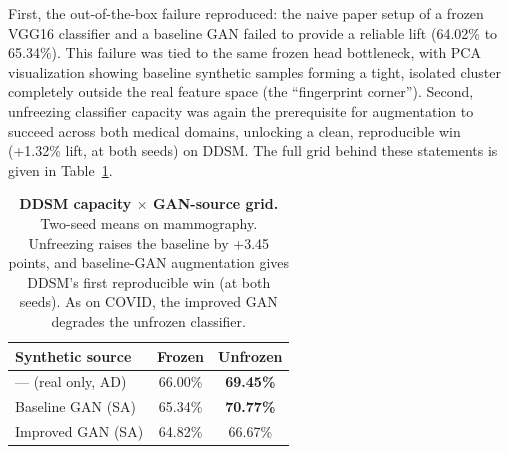\documentclass[11pt]{article}
\begin{document}
\begin{table}[htbp]
\centering
\caption{\textbf{Replication on CBIS-DDSM: Matched-Epoch GAN Comparison.} Classification results on mammography mass-only ROIs showing baseline and improved architectures trained to exactly 300 epochs.}
\label{tab:ddsm_matched_epoch}
\end{table}

First, the out-of-the-box failure reproduced: the naive paper setup of a frozen VGG16 classifier and a baseline GAN failed to provide a reliable lift (64.02\% to 65.34\%). This failure was tied to the same frozen head bottleneck, with PCA visualization showing baseline synthetic samples forming a tight, isolated cluster completely outside the real feature space (the ``fingerprint corner''). Second, unfreezing classifier capacity was again the prerequisite for augmentation to succeed across both medical domains, unlocking a clean, reproducible win (+1.32\% lift, at both seeds) on DDSM. The full grid behind these statements is given in Table~\ref{tab:ddsm_capacity}.

\begin{table}[htbp]
\centering
\caption{\textbf{DDSM capacity $\times$ GAN-source grid.} Two-seed means on mammography. Unfreezing raises the baseline by +3.45 points, and baseline-GAN augmentation gives DDSM's first reproducible win (at both seeds). As on COVID, the improved GAN degrades the unfrozen classifier.}
\label{tab:ddsm_capacity}
\begin{tabular}{@{}lcc@{}}
\toprule
\textbf{Synthetic source} & \textbf{Frozen} & \textbf{Unfrozen} \\
\midrule
--- (real only, AD) & 66.00\% & \textbf{69.45\%} \\
Baseline GAN (SA) & 65.34\% & \textbf{70.77\%} \\
Improved GAN (SA) & 64.82\% & 66.67\% \\
\bottomrule
\end{tabular}
\end{table}
\end{document}
